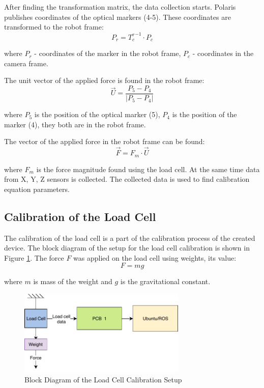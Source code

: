 	After finding the transformation matrix, the data collection starts. Polaris publishes coordinates of the optical markers (4-5). These coordinates are transformed to the robot frame:
\begin{equation}
P_{r} = {T_{c}^{ r}}^{-1} \cdot P_{c}
\end{equation}

	where $P_{r}$ - coordinates of the marker in the robot frame, $P_{c}$ - coordinates in the camera frame.
	
	The unit vector of the applied force is found in the robot frame:
\begin{equation}
\vec{U} = \frac{P_{5} - P_{4}}{|P_{5} - P_{4}|}
\end{equation}
	
	where $P_{5}$ is the position of the optical marker (5), $P_{4}$ is the position of the marker (4), they both are in the robot frame.
	
	The vector of the applied force in the robot frame can be found:
\begin{equation}
\vec{F} = F_{m} \cdot \vec{U}
\end{equation}

	where $F_{m}$ is the force magnitude found using the load cell.
	At the same time data from X, Y, Z sensors is collected. The collected data is used to find calibration equation parameters.
	
	\subsection{Calibration of the Load Cell}
	\label{sec:CalLoadCell}
	The calibration of the load cell is a part of the calibration process of the created device. The block diagram of the setup for the load cell calibration is shown in Figure \ref{fig:Calib_setup_LC}. The force $F$ was applied on the load cell using weights, its value: 
\begin{equation}
F = mg
\end{equation}

	where $m$ is mass of the weight and $g$ is the gravitational constant.

\begin{figure}[h]
	\begin{center}
	\includegraphics[width=80mm]{fig/methods/Load_Cell_Calibration.pdf}
	\end{center}
	\vspace{-4mm}
	\caption[Block Diagram of the Load Cell Calibration Setup]
	{Block Diagram of the Load Cell Calibration Setup}
	\label{fig:Calib_setup_LC}
	\vspace{-2mm}
\end{figure}

